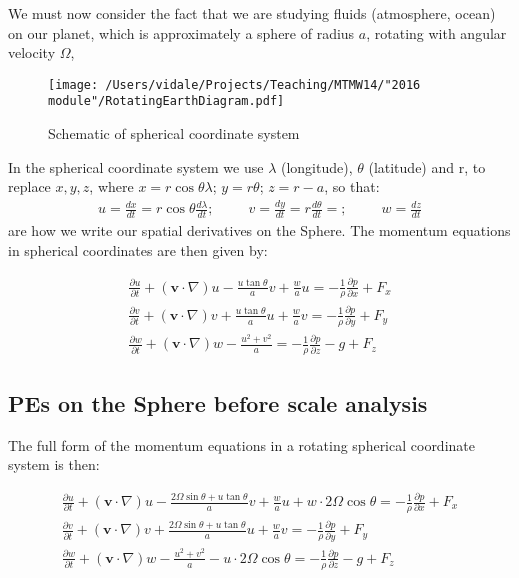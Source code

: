 We must now consider the fact that we are studying fluids (atmosphere, ocean) on our planet, which is approximately a sphere of radius $a$, rotating with angular velocity $\Omega$,

\begin{figure}[h!]
	\begin{center}
		\texttt{[image: /Users/vidale/Projects/Teaching/MTMW14/"2016 module"/RotatingEarthDiagram.pdf]}
		\label{fig:Spherical}
	\end{center}
	\caption{\label{fig:blue_rectangle} Schematic of spherical coordinate system}
\end{figure}

	In the spherical coordinate system we use $\lambda$ (longitude), $\theta$ (latitude) and r, to replace $x,y,z$, where $x=r \cos{\theta} \lambda$; $y=r\theta$; $z=r-a$, so that:
	\begin{eqnarray}
		u=\frac {dx}{dt}=r \cos{\theta} \frac {d \lambda}{d t} ; ~~~~~~~~~~~ v=\frac {dy}{dt}= r\frac {d\theta}{dt}= ; ~~~~~~~~~~~ w=\frac {dz }{dt }
	\end{eqnarray}
	are how we write our spatial derivatives on the Sphere.	 The momentum equations in spherical coordinates are then given by:

\begin{eqnarray}
	\frac {\partial u}{\partial t} + \left(\mathbf{v}\cdot\nabla\right)u - \frac{u \tan \theta}{a} v  + \frac{w}{a}u =-\frac{1}{\rho} \frac{\partial p}{\partial x}+F_x \\
	\frac {\partial v}{\partial t} + \left(\mathbf{v}\cdot\nabla\right)v + \frac{u \tan \theta}{a} u  + \frac{w}{a}v =-\frac{1}{\rho} \frac{\partial p}{\partial y}+F_y \\
	\frac {\partial w}{\partial t} + \left(\mathbf{v}\cdot\nabla\right)w - \frac{u^2 + v^2}{a} =-\frac{1}{\rho} \frac{\partial p}{\partial z}-g+F_z
\end{eqnarray}


\subsection{PEs on the Sphere before scale analysis}

The full form of the momentum equations in a rotating spherical coordinate system is then:

\begin{eqnarray}
	\frac {\partial u}{\partial t} + \left(\mathbf{v}\cdot\nabla\right)u - \frac{2 \Omega \sin \theta + u \tan \theta}{a} v  + \frac{w}{a}u + w \cdot 2 \Omega \cos \theta =-\frac{1}{\rho} \frac{\partial p}{\partial x}+F_x \\
	\frac {\partial v}{\partial t} + \left(\mathbf{v}\cdot\nabla\right)v + \frac{2 \Omega \sin \theta +u \tan \theta}{a} u  + \frac{w}{a}v =-\frac{1}{\rho} \frac{\partial p}{\partial y}+F_y \\
	\frac {\partial w}{\partial t} + \left(\mathbf{v}\cdot\nabla\right)w - \frac{u^2 + v^2}{a} - u \cdot 2 \Omega \cos \theta =-\frac{1}{\rho} \frac{\partial p}{\partial z}-g+F_z
\end{eqnarray}

